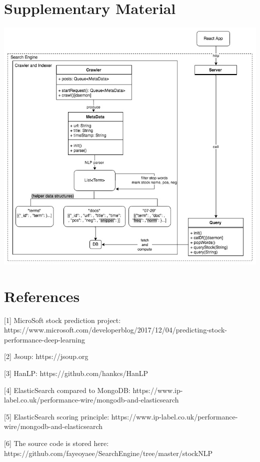 \documentclass{article}
\begin{document}
\section{Supplementary Material}
\includegraphics[width=7in]{StockNLP_Pipeline}

\section{References}
\vspace{-5pt}\hspace{-15pt}[1] MicroSoft stock prediction project: https://www.microsoft.com/developerblog/2017/12/04/predicting-stock-performance-deep-learning\par
\vspace{-5pt}\hspace{-15pt}[2] Jsoup: https://jsoup.org\par
\vspace{-5pt}\hspace{-15pt}[3] HanLP: https://github.com/hankcs/HanLP\par
\vspace{-5pt}\hspace{-15pt}[4] ElasticSearch compared to MongoDB: https://www.ip-label.co.uk/performance-wire/mongodb-and-elasticsearch\par
\vspace{-5pt}\hspace{-15pt}[5] ElasticSearch scoring principle: https://www.ip-label.co.uk/performance-wire/mongodb-and-elasticsearch\par
\vspace{-5pt}\hspace{-15pt}[6] The source code is stored here: https://github.com/fayeoyaee/SearchEngine/tree/master/stockNLP\par
\end{document}
